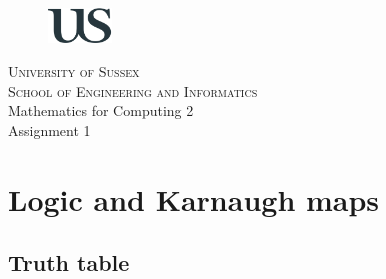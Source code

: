 \documentclass[12pt]{article}
\begin{document}
\begin{titlepage}
\begin{figure}[t]
    \centering\includegraphics[width=0.15\textwidth]{logo}
\end{figure}
\begin{center}
    \textsc{ \LARGE{University of Sussex \\}}
	\textsc{School of Engineering and Informatics\\}
	\vspace{12mm}
	\fontsize{6mm}{7mm}\textnormal{Mathematics for Computing 2\\}
	\fontsize{10mm}{7mm}\selectfont
	\vspace{2mm}
    \textup{Assignment 1}\\
\end{center}

\vspace{25mm}


\end{titlepage}
\tableofcontents

\section{Logic and Karnaugh maps}
\subsection{Truth table}
\end{document}
